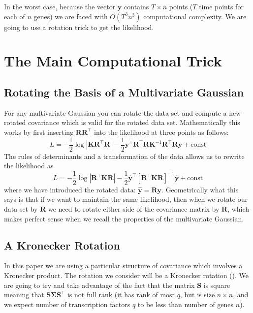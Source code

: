 In the worst case, because the vector $\mathbf{y}$ contains $T\times n$ points ($T$ time points for each of $n$ genes) we are faced with $O(T^3n^3)$ computational complexity. We are going to use a rotation trick to get the likelihood. 

\section{The Main Computational Trick}

\subsection{Rotating the Basis of a Multivariate Gaussian}
For any multivariate Gaussian you can rotate the data set and compute a new rotated covariance which is valid for the rotated data set. Mathematically this works by first inserting $\mathbf{R}\mathbf{R}^\top$ into the likelihood at three points as follows:
\begin{equation} \label{eq:LikelihoodRotation}
  L = -\frac{1}{2} \log |\mathbf{K}\mathbf{R}^\top\mathbf{R}| 
      - \frac{1}{2} \mathbf{y}^\top\mathbf{R}^\top\mathbf{R} \mathbf{K}^{-1}\mathbf{R}^\top\mathbf{R} \mathbf{y} 
      + \text{const}
\end{equation}
The rules of determinants and a transformation of the data allows us to rewrite the likelihood as
\begin{equation} \label{eq:LikelihoodRotationRerite}
  L = -\frac{1}{2} \log |\mathbf{R}^\top\mathbf{K}\mathbf{R}| 
      - \frac{1}{2} \hat{\mathbf{y}}^\top \left[\mathbf{R}^\top\mathbf{K}\mathbf{R}\right]^{-1}\hat{\mathbf{y}} 
      + \text{const}
\end{equation}
where we have introduced the rotated data: $\hat{\mathbf{y}}=\mathbf{R} \mathbf{y}$. 
Geometrically what this says is that if we want to maintain the same likelihood, then when we rotate our data set by $\mathbf{R}$ we need to rotate either side of the covariance matrix by $\mathbf{R}$, which makes perfect sense when we recall the properties of the multivariate Gaussian. 

\subsection{A Kronecker Rotation}
In this paper we are using a particular structure of covariance which involves a Kronecker product. The rotation we consider will be a Kronecker rotation (\cite{Stegle:2011}). We are going to try and take advantage of the fact that the matrix $\mathbf{S}$ is square meaning that $\mathbf{S}\boldsymbol{\Sigma}\mathbf{S}^\top$ is not full rank (it has rank of most $q$, but is size $n\times n$, and we expect number of transcription factors $q$ to be less than number of genes $n$). 

